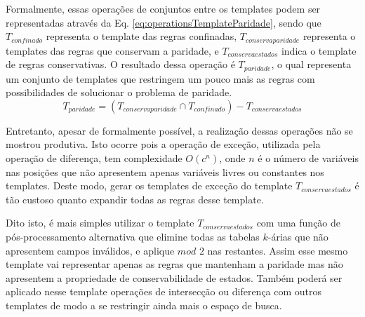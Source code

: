 Formalmente, essas operações de conjuntos entre os templates podem ser representadas através da Eq. \eqref{eq:operationsTemplateParidade}, sendo que $T_{confinado}$ representa o template das regras confinadas, $T_{conservaparidade}$ representa o templates das regras que conservam a paridade, e ${T}_{conservaestados}$ indica o template de regras conservativas. O resultado dessa operação é $T_{paridade}$, o qual representa um conjunto de templates que restringem um pouco mais as regras com possibilidades de solucionar o problema de paridade.
\begin{equation}
T_{paridade} = (T_{conservaparidade} \cap T_{confinado}) - {T}_{conservaestados}
\label{eq:operationsTemplateParidade}
\end{equation}

Entretanto, apesar de formalmente possível, a realização dessas operações não se mostrou produtiva. Isto ocorre pois a operação de exceção, utilizada pela operação de diferença, tem complexidade $O(c^n)$, onde $n$ é o número de variáveis nas posições que não apresentem apenas variáveis livres ou constantes nos templates. Deste modo, gerar os templates de exceção do template $T_{conservaestados}$ é tão custoso quanto expandir todas as regras desse template.

Dito isto, é mais simples utilizar o template $T_{conservaestados}$ com uma função de pós-processamento alternativa que elimine todas as tabelas $k$-árias que não apresentem campos inválidos, e aplique $mod$ $2$ nas restantes. Assim  esse mesmo template vai representar apenas as regras que mantenham a paridade mas não apresentem a propriedade de conservabilidade de estados. Também poderá ser aplicado nesse template operações de intersecção ou diferença com outros templates de modo a se restringir ainda mais o espaço de busca.
